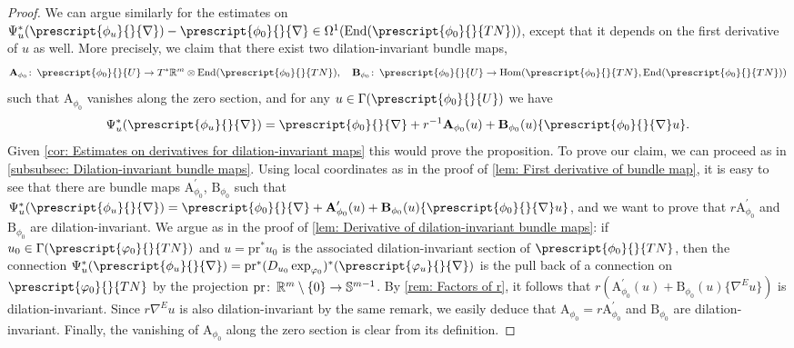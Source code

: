\documentclass{article}
\numberwithin{equation}{section}        %
\theoremstyle{bfnote}
\theoremstyle{definition}
\theoremstyle{bfremark}
\newcommand{\col}{\colon \thinspace}        %
\newcommand{\R}{\mathbb{R}}                 %
\newcommand{\Sp}{\mathbb{S}}                %
\newcommand{\pr}{\mathrm{pr}}               %
\newcommand{\bmap}[1]{\boldsymbol{\mathrm{#1}}}     %
\DeclareMathOperator{\Hom}{Hom}                 %
\DeclareMathOperator{\End}{End}                 %
\begin{document}
\begin{proof}
    We can argue similarly for the estimates on $\Psi^*_u (\prescript{\phi_u}{}{\nabla}) - \prescript{\phi_0}{}{\nabla} \in \Omega^1(\End(\prescript{\phi_0}{}{TN}))$, except that it depends on the first derivative of $u$ as well. More precisely, we claim that there exist two dilation-invariant bundle maps,
    \begin{align*}
        \bmap{A}_{\phi_0} \col \prescript{\phi_0}{}{U} \to T^*\R^m \otimes \End(\prescript{\phi_0}{}{TN}), ~~~ \bmap{B}_{\phi_0} \col \prescript{\phi_0}{}{U} \to \Hom(\prescript{\phi_0}{}{TN}, \End(\prescript{\phi_0}{}{TN}))
    \end{align*}
    such that $\bmap{A}_{\phi_0}$ vanishes along the zero section, and for any $u \in \Gamma(\prescript{\phi_0}{}{U})$ we have
    \begin{equation*}
        \Psi_u^* (\prescript{\phi_u}{}{\nabla}) = \prescript{\phi_0}{}{\nabla} + r^{-1}\bmap{A}_{\phi_0}(u) + \bmap{B}_{\phi_0}(u)\{\prescript{\phi_0}{}{\nabla}u\} .
    \end{equation*}
    Given \cref{cor: Estimates on derivatives for dilation-invariant maps} this would prove the proposition. To prove our claim, we can proceed as in \cref{subsubsec: Dilation-invariant bundle maps}. Using local coordinates as in the proof of \cref{lem: First derivative of bundle map}, it is easy to see that there are bundle maps $\bmap{A}^\prime_{\phi_0}$, $\bmap{B}_{\phi_0}$ such that $\Psi_u^* (\prescript{\phi_u}{}{\nabla}) = \prescript{\phi_0}{}{\nabla} + \bmap{A}^\prime_{\phi_0}(u) + \bmap{B}_{\phi_0}(u)\{\prescript{\phi_0}{}{\nabla}u\}$, and we want to prove that $r \bmap{A}^\prime_{\phi_0}$ and $\bmap{B}_{\phi_0}$ are dilation-invariant. We argue as in the proof of \cref{lem: Derivative of dilation-invariant bundle maps}: if $u_0 \in \Gamma(\prescript{\varphi_0}{}{TN})$ and $u = \pr^* u_0$ is the associated dilation-invariant section of $\prescript{\phi_0}{}{TN}$, then the connection $\Psi_u^*(\prescript{\phi_u}{}{\nabla}) = \pr^*(D_{u_0} \exp_{\varphi_0})^*(\prescript{\varphi_u}{}{\nabla})$ is the pull back of a connection on $\prescript{\varphi_0}{}{TN}$ by the projection $\pr \col \R^m \setminus \{0\} \to \Sp^{m-1}$. By \cref{rem: Factors of r}, it follows that $r(\bmap{A}^\prime_{\phi_0}(u) + \bmap{B}_{\phi_0}(u)\{\nabla^E u\})$ is dilation-invariant. Since $r \nabla^E u$ is also dilation-invariant by the same remark, we easily deduce that $\bmap{A}_{\phi_0} = r \bmap{A}^\prime_{\phi_0}$ and $\bmap{B}_{\phi_0}$ are dilation-invariant. Finally, the vanishing of $\bmap{A}_{\phi_0}$ along the zero section is clear from its definition.
\end{proof}
\end{document}
